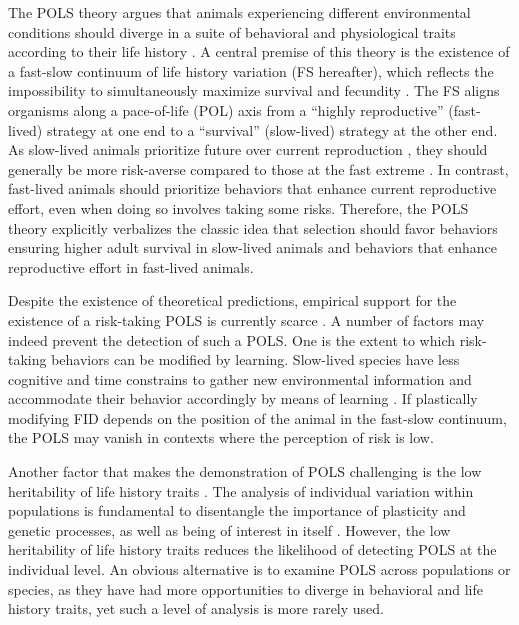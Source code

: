 The POLS theory argues that animals experiencing different
environmental conditions should diverge in a suite of behavioral
and physiological traits according to their life history 
\citep{Ricklefs2002, Tieleman2005, Hau2010a, Reale2010a}. 
A central premise of this theory is the existence of a
fast-slow continuum of life history variation (FS hereafter),
which reflects the impossibility to simultaneously maximize survival
and fecundity \citep{Stearns1983a, Saether1988}. The FS aligns
organisms along a pace-of-life (POL) axis from a ``highly
reproductive'' (fast-lived) strategy at one end to a ``survival''
(slow-lived) strategy at the other end. As slow-lived animals
prioritize future over current reproduction \citep{Stearns2000}, they
should generally be more risk-averse compared to those at the
fast extreme \citep{Martin2000, Wolf2007, Hau2010a, Moller2012, Moller2013a}.
In contrast, fast-lived animals should prioritize behaviors that
enhance current reproductive effort, even when doing so involves
taking some risks. Therefore, the POLS theory explicitly verbalizes
the classic idea that selection should favor behaviors ensuring
higher adult survival in slow-lived animals and behaviors that
enhance reproductive effort in fast-lived animals.

Despite the existence of theoretical predictions, empirical
support for the existence of a risk-taking POLS is currently
scarce \citep{Hille2015, Charmantier2017}. A %
number of factors may indeed prevent the detection of such a
POLS. One is the extent to which risk-taking behaviors can be
modified by learning. Slow-lived species have less cognitive
and time constrains to gather new environmental information
and accommodate their behavior accordingly by means of
learning \citep{VanSchaik2003, Sol2009a, Sih2012, Sol2016a}.
If plastically modifying FID
depends on the position of the animal in the fast-slow continuum,
the POLS may vanish in contexts where the perception
of risk is low.

Another factor that makes the demonstration of POLS challenging
is the low heritability of life history traits \citep{Price1991}.
The analysis of individual variation within
populations is fundamental to disentangle the importance of
plasticity and genetic processes, as well as being of interest in
itself \citep{Reale2007}. However, the low heritability of life
history traits reduces the likelihood of detecting POLS at the
individual level. An obvious alternative is to examine POLS
across populations or species, as they have had more opportunities
to diverge in behavioral and life history traits, yet such
a level of analysis is more rarely used.

